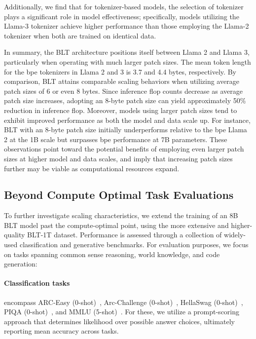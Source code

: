 Additionally, we find that for tokenizer-based models, the selection of tokenizer plays a significant role in model effectiveness; specifically, models utilizing the Llama-3 tokenizer achieve higher performance than those employing the Llama-2 tokenizer when both are trained on identical data.

In summary, the {\textsc BLT} architecture positions itself between Llama 2 and Llama 3, particularly when operating with much larger patch sizes. The mean token length for the bpe tokenizers in Llama 2 and 3 is 3.7 and 4.4 bytes, respectively. By comparison, {\textsc BLT} attains comparable scaling behaviors when utilizing average patch sizes of 6 or even 8 bytes. Since inference flop counts decrease as average patch size increases, adopting an 8-byte patch size can yield approximately 50\% reduction in inference flop. Moreover, models using larger patch sizes tend to exhibit improved performance as both the model and data scale up. For instance, {\textsc BLT} with an 8-byte patch size initially underperforms relative to the bpe Llama 2 at the 1B scale but surpasses bpe performance at 7B parameters. These observations point toward the potential benefits of employing even larger patch sizes at higher model and data scales, and imply that increasing patch sizes further may be viable as computational resources expand.

\subsection{Beyond Compute Optimal Task Evaluations}
\label{section:evals}
To further investigate scaling characteristics, we extend the training of an 8B {\textsc BLT} model past the compute-optimal point, using the more extensive and higher-quality {\textsc BLT}-1T dataset. Performance is assessed through a collection of widely-used classification and generative benchmarks. For evaluation purposes, we focus on tasks spanning common sense reasoning, world knowledge, and code generation:
\paragraph{Classification tasks} encompass ARC-Easy (0-shot)~\citep{Eval_ARC}, Arc-Challenge (0-shot)~\citep{Eval_ARC}, HellaSwag (0-shot)~\citep{Eval_hellaswag}, PIQA (0-shot)~\citep{Eval_piqa}, and MMLU (5-shot)~\citep{hendrycks2020measuring}. For these, we utilize a prompt-scoring approach that determines likelihood over possible answer choices, ultimately reporting mean accuracy across tasks.
